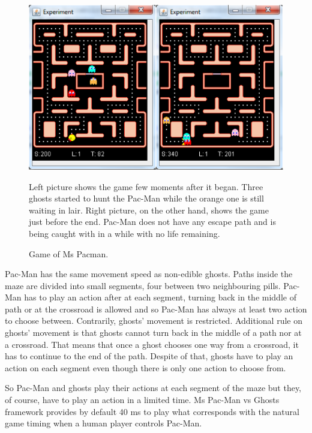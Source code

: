 \begin{figure}
\begin{center}
\includegraphics[width=14cm]{img/pacman_framework.eps}
\end{center}
\caption{\footnotesize Game of Ms Pacman.}{\footnotesize Left picture shows the game few moments after it began. Three
ghosts started to hunt the Pac-Man while the orange one is still waiting in lair. Right
picture, on the other hand, shows the game just before the end. Pac-Man does not have any
escape path and is being caught with in a while with no life remaining.}
\label{fig_pacman_framework}
\end{figure}

Pac-Man has the same movement speed as non-edible ghosts. Paths inside the maze are divided
into small segments, four between two neighbouring pills. Pac-Man has to play an action after
at each segment, turning back in the middle of path or at the crossroad is allowed and so
Pac-Man has always at least two action to choose between. Contrarily, ghosts' movement is
restricted. Additional rule on ghosts' movement is that ghosts cannot turn back in the middle
of a path nor at a crossroad. That means that once a ghost chooses one way from a crossroad, it
has to continue to the end of the path. Despite of that, ghosts have to play an action on each
segment even though there is only one action to choose from.


So Pac-Man and ghosts play their actions at each segment of the maze but they, of course, have
to play an action in a limited time. Ms Pac-Man vs Ghosts framework provides by default 40 ms
to play what corresponds with the natural game timing when a human player controls Pac-Man.

